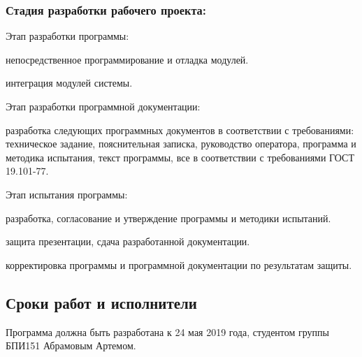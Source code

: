 \subsubsection{Стадия разработки рабочего проекта:}
\begin{my_enumerate}
\item Этап разработки программы:
    \begin{my_enumerate}
    \item непосредственное программирование и отладка модулей.
    \item интеграция модулей системы.
    \end{my_enumerate}
\item Этап разработки программной документации:
    \begin{my_enumerate}
    \item разработка следующих программных документов в соответствии с требованиями: техническое задание, пояснительная записка, руководство оператора, программа и методика испытания, текст программы, все в соответствии с требованиями ГОСТ 19.101-77.
    \end{my_enumerate}
\item Этап испытания программы:    
    \begin{my_enumerate}
    \item разработка, согласование и утверждение программы и методики испытаний.
    \item защита презентации, сдача разработанной документации.
    \item корректировка программы и программной документации по результатам защиты.
    \end{my_enumerate}
\end{my_enumerate}


\subsection{Сроки работ и исполнители}
Программа должна быть разработана к 24 мая 2019 года, студентом группы БПИ151 Абрамовым Артемом.
